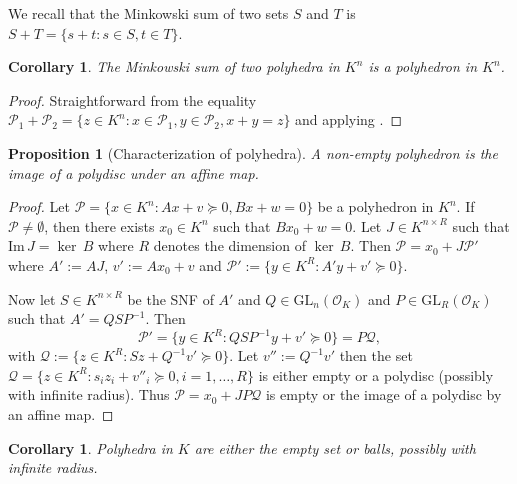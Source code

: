 \documentclass[sigconf]{acmart}
\newcommand{\PP}{\mathcal{P}}
\newtheorem{proposition}[theorem]{Proposition}
\newtheorem{corollary}[theorem]{Corollary}
\newcommand{\GL}{\mathrm{GL}}
\begin{document}
We recall that the Minkowski sum of two sets $S$ and $T$ is $S+T = \{s+t : s \in S, t \in T\}$.

\begin{corollary}
The Minkowski sum of two polyhedra in $K^n$ is a polyhedron in $K^n$.
\end{corollary}
\begin{proof}
  Straightforward from the equality
  $\PP_1 + \PP_2 = \{z \in K^n : x \in \PP_1, y \in \PP_2, x+y=z\}$
  and applying .
\end{proof}

\begin{proposition}[Characterization of polyhedra] \label{prop:carac}
    A non-empty polyhedron is the image of a polydisc under an affine map.
\end{proposition}
\begin{proof}
    Let $\PP = \{x \in K^n : Ax+v \succeq 0, Bx + w = 0\}$ be a polyhedron in $K^n$.
    If $\PP \neq \emptyset$, then there exists $x_0 \in K^n$ such that $Bx_0+w=0$.
    Let $J \in K^{n \times R}$ such that $\mathrm{Im}\,J = \ker\,B$ where $R$ denotes
    the dimension of $\ker\,B$. Then $\PP = x_0 + J\PP'$ where
    $A' := AJ$, $v' := Ax_0 + v$ and
    $\PP' := \{y \in K^R : A'y + v' \succeq 0 \}$.

    Now let $S \in K^{n\times R}$ be the SNF of $A'$ and $Q \in \GL_n\left(\mathcal{O}_K\right)$
    and $P \in \GL_R(\mathcal{O}_K)$ such that $A'= Q S P^{-1}$.
    Then
    $$
    \PP' = \{y \in K^R : QSP^{-1}y + v' \succeq 0\} = P \mathcal{Q},
    $$
    with $\mathcal{Q} := \{z \in K^R : Sz + Q^{-1}v' \succeq 0 \}$.
    Let $v'' := Q^{-1}v'$ then the set
    $\mathcal{Q} = \{z \in K^R : s_i z_i + v''_i \succeq 0, i= 1,\ldots,R\}$
    is either empty or a polydisc (possibly with infinite radius).
    Thus $\PP = x_0+JP\mathcal{Q}$ is empty or the image of a polydisc by an affine map.
\end{proof}

\begin{corollary} \label{cor:caracdim1}
   Polyhedra in $K$ are either the empty set or balls, possibly with infinite radius.
\end{corollary}
\end{document}
